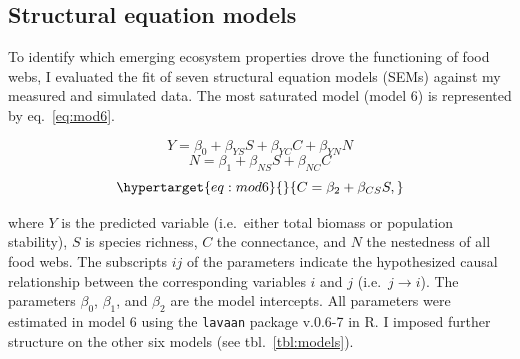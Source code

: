 \documentclass[11pt]{article}
\begin{document}
\hypertarget{structural-equation-models}{%
\subsection{Structural equation
models}\label{structural-equation-models}}

To identify which emerging ecosystem properties drove the functioning of
food webs, I evaluated the fit of seven structural equation models
(SEMs) against my measured and simulated data. The most saturated model
(model 6) is represented by eq.~\ref{eq:mod6}.

\[Y = \beta_0 + \beta_{YS}S + \beta_{YC}C + \beta_{YN}N\]
\[ N = \beta_1 + \beta_{NS}S + \beta_{NC}C\]
\begin{equation}\protect\hypertarget{eq:mod6}{}{ C = \beta_2 + \beta_{CS}S, }\label{eq:mod6}\end{equation}

where \(Y\) is the predicted variable (i.e.~either total biomass or
population stability), \(S\) is species richness, \(C\) the connectance,
and \(N\) the nestedness of all food webs. The subscripts \({ij}\) of
the parameters indicate the hypothesized causal relationship between the
corresponding variables \(i\) and \(j\) (i.e.~\(j \rightarrow i\)). The
parameters \(\beta_0\), \(\beta_1\), and \(\beta_2\) are the model
intercepts. All parameters were estimated in model 6 using the
\texttt{lavaan} package v.0.6-7 in R. I imposed further structure on the
other six models (see tbl.~\ref{tbl:models}).
\end{document}
